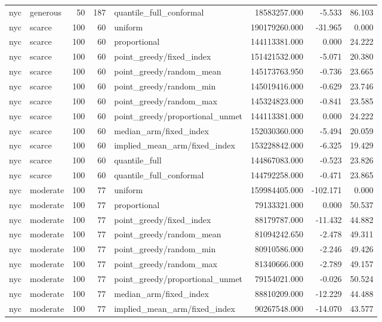 \begin{tabular}{llrrlrrr}
nyc & generous & 50 & 187 & quantile\_full\_conformal & 18583257.000 & -5.533 & 86.103 \\
nyc & scarce & 100 & 60 & uniform & 190179260.000 & -31.965 & 0.000 \\
nyc & scarce & 100 & 60 & proportional & 144113381.000 & 0.000 & 24.222 \\
nyc & scarce & 100 & 60 & point\_greedy/fixed\_index & 151421532.000 & -5.071 & 20.380 \\
nyc & scarce & 100 & 60 & point\_greedy/random\_mean & 145173763.950 & -0.736 & 23.665 \\
nyc & scarce & 100 & 60 & point\_greedy/random\_min & 145019416.000 & -0.629 & 23.746 \\
nyc & scarce & 100 & 60 & point\_greedy/random\_max & 145324823.000 & -0.841 & 23.585 \\
nyc & scarce & 100 & 60 & point\_greedy/proportional\_unmet & 144113381.000 & 0.000 & 24.222 \\
nyc & scarce & 100 & 60 & median\_arm/fixed\_index & 152030360.000 & -5.494 & 20.059 \\
nyc & scarce & 100 & 60 & implied\_mean\_arm/fixed\_index & 153228842.000 & -6.325 & 19.429 \\
nyc & scarce & 100 & 60 & quantile\_full & 144867083.000 & -0.523 & 23.826 \\
nyc & scarce & 100 & 60 & quantile\_full\_conformal & 144792258.000 & -0.471 & 23.865 \\
nyc & moderate & 100 & 77 & uniform & 159984405.000 & -102.171 & 0.000 \\
nyc & moderate & 100 & 77 & proportional & 79133321.000 & 0.000 & 50.537 \\
nyc & moderate & 100 & 77 & point\_greedy/fixed\_index & 88179787.000 & -11.432 & 44.882 \\
nyc & moderate & 100 & 77 & point\_greedy/random\_mean & 81094242.650 & -2.478 & 49.311 \\
nyc & moderate & 100 & 77 & point\_greedy/random\_min & 80910586.000 & -2.246 & 49.426 \\
nyc & moderate & 100 & 77 & point\_greedy/random\_max & 81340666.000 & -2.789 & 49.157 \\
nyc & moderate & 100 & 77 & point\_greedy/proportional\_unmet & 79154021.000 & -0.026 & 50.524 \\
nyc & moderate & 100 & 77 & median\_arm/fixed\_index & 88810209.000 & -12.229 & 44.488 \\
nyc & moderate & 100 & 77 & implied\_mean\_arm/fixed\_index & 90267548.000 & -14.070 & 43.577 \\

\end{tabular}
